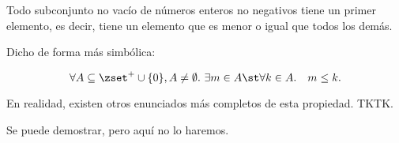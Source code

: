 


\begin{theorem}\label{princ-buena-ord}
  Todo subconjunto no vacío de números enteros no negativos tiene un primer
  elemento, es decir, tiene un elemento que es menor o igual que todos los
  demás.
\end{theorem}


Dicho de forma más simbólica:

$$ \forall A \subseteq \zset^{+} \cup \{0\}, A \neq \emptyset. \ \exists m
\in A \st \forall k \in A. \quad m \leq k. $$

En realidad, existen otros enunciados más completos de esta propiedad. TKTK.

Se puede demostrar, pero aquí no lo haremos.

\iffalse
Para todo conjunto $A \subseteq \zset^{+} \cup \{0\}$, con $A \neq
\emptyset$, existe un $m \in A$ tal que para todo $k \in A$, $m \leq k$.
\fi




